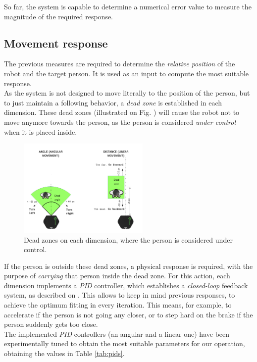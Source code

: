 So far, the system is capable to determine a numerical error value to measure the magnitude of the required response.\\


\subsection{Movement response}

The previous measures are required to determine the \emph{relative position} of the robot and the target person. It is used as an input to compute the most suitable response.\\

As the system is not designed to move literally to the position of the person, but to just maintain a following behavior, a \emph{dead zone} is established in each dimension. These dead zones (illustrated on Fig. ) will cause the robot not to move anymore towards the person, as the person is considered \emph{under control} when it is placed inside.\\


\begin{figure}[h]
	\centering
	\includegraphics[width=2.5in]{images/dead_zones}
	\caption{Dead zones on each dimension, where the person is considered under control.}
	\label{fig:dead_zones}
\end{figure}


If the person is outside these dead zones, a physical response is required, with the purpose of \emph{carrying} that person inside the dead zone. For this action, each dimension implements a \emph{PID} controller, which establishes a \emph{closed-loop} feedback system, as described on \cite{pid-controller}. This allows to keep in mind previous responses, to achieve the optimum fitting in every iteration. This means, for example, to accelerate if the person is not going any closer, or to step hard on the brake if the person suddenly gets too close.\\

The implemented \emph{PID} controllers (an angular and a linear one) have been experimentally tuned to obtain the most suitable parameters for our operation, obtaining the values in Table \ref{tab:pids}.\\

